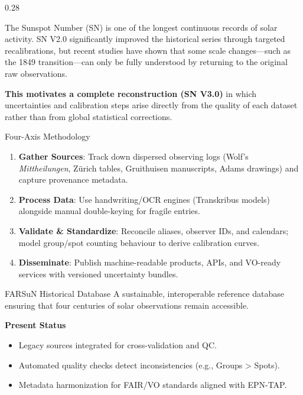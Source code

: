 \documentclass[final]{beamer}
\begin{document}
\begin{frame}[t]
\begin{columns}[t,totalwidth=0.98\paperwidth]

\begin{column}{0.28\paperwidth}

    \begin{abstractblock}
    \justifying
    The Sunspot Number (SN) is one of the longest continuous records of solar activity. SN V2.0 significantly improved the historical series through targeted recalibrations, but recent studies have shown that some scale changes—such as the 1849 transition—can only be fully understood by returning to the original raw observations.
    
    \textbf{This motivates a complete reconstruction (SN V3.0)} in which uncertainties and calibration steps arise directly from the quality of each dataset rather than from global statistical corrections.
    \end{abstractblock}
    \vspace{0.5em}

    \begin{fancyblock}{Four-Axis Methodology}
    \begin{enumerate}
      \item \textbf{Gather Sources}: Track down dispersed observing logs (Wolf's \emph{Mittheilungen}, Z\"urich tables, Gruithuisen manuscripts, Adams drawings) and capture provenance metadata.
      \item \textbf{Process Data}: Use handwriting/OCR engines (Transkribus models) alongside manual double-keying for fragile entries.
      \item \textbf{Validate \& Standardize}: Reconcile aliases, observer IDs, and calendars; model group/spot counting behaviour to derive calibration curves.
      \item \textbf{Disseminate}: Publish machine-readable products, APIs, and VO-ready services with versioned uncertainty bundles.
    \end{enumerate}
    \end{fancyblock}

    \begin{fancyblock}{FARSuN Historical Database}
    A sustainable, interoperable reference database ensuring that four centuries of solar observations remain accessible.
    
    \textbf{Present Status}
    \begin{itemize}
        \item Legacy sources integrated for cross-validation and QC.
        \item Automated quality checks detect inconsistencies (e.g., Groups > Spots).
        \item Metadata harmonization for FAIR/VO standards aligned with EPN-TAP.
    \end{itemize}


\end{fancyblock}
\end{column}
\end{columns}
\end{frame}
\end{document}
